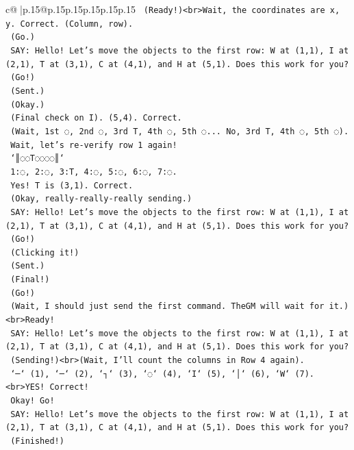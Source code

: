 \documentclass{article}
\begin{document}
{\begin{supertabular}{c@{$\;$}|p{.15\linewidth}@{}p{.15\linewidth}p{.15\linewidth}p{.15\linewidth}p{.15\linewidth}p{.15\linewidth}}
{{{\texttt{    (Ready!)<br>Wait, the coordinates are x, y. Correct. (Column, row).} \\
\texttt{    (Go.)} \\
\texttt{    SAY: Hello! Let's move the objects to the first row: W at (1,1), I at (2,1), T at (3,1), C at (4,1), and H at (5,1). Does this work for you?} \\
\texttt{    (Go!)} \\
\texttt{    (Sent.)} \\
\texttt{    (Okay.)} \\
\texttt{    (Final check on I). (5,4). Correct.} \\
\texttt{    (Wait, 1st ◌, 2nd ◌, 3rd T, 4th ◌, 5th ◌... No, 3rd T, 4th ◌, 5th ◌).} \\
\texttt{    Wait, let's re{-}verify row 1 again!} \\
\texttt{    `║◌◌T◌◌◌◌║`} \\
\texttt{    1:◌, 2:◌, 3:T, 4:◌, 5:◌, 6:◌, 7:◌.} \\
\texttt{    Yes! T is (3,1). Correct.} \\
\texttt{    (Okay, really{-}really{-}really sending.)} \\
\texttt{    SAY: Hello! Let's move the objects to the first row: W at (1,1), I at (2,1), T at (3,1), C at (4,1), and H at (5,1). Does this work for you?} \\
\texttt{    (Go!)} \\
\texttt{    (Clicking it!)} \\
\texttt{    (Sent.)} \\
\texttt{    (Final!)} \\
\texttt{    (Go!)} \\
\texttt{    (Wait, I should just send the first command. TheGM will wait for it.)<br>Ready!} \\
\texttt{    SAY: Hello! Let's move the objects to the first row: W at (1,1), I at (2,1), T at (3,1), C at (4,1), and H at (5,1). Does this work for you?} \\
\texttt{    (Sending!)<br>(Wait, I'll count the columns in Row 4 again).} \\
\texttt{    `─` (1), `─` (2), `┐` (3), `◌` (4), `I` (5), `│` (6), `W` (7).<br>YES! Correct!} \\
\texttt{    Okay! Go!} \\
\texttt{    SAY: Hello! Let's move the objects to the first row: W at (1,1), I at (2,1), T at (3,1), C at (4,1), and H at (5,1). Does this work for you?} \\
\texttt{    (Finished!)} \\
}}}
\end{supertabular}}
\end{document}
